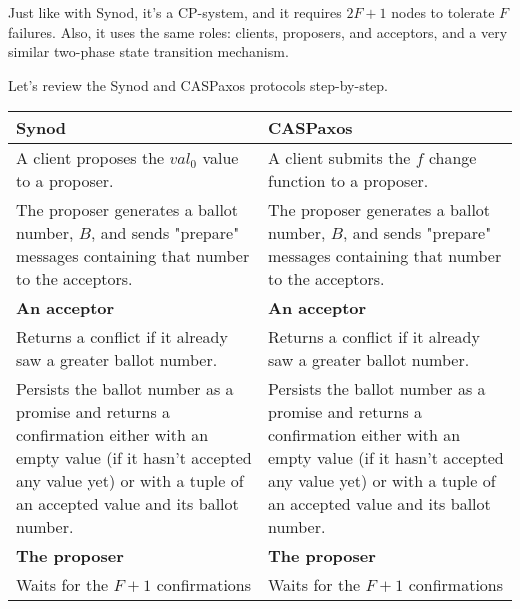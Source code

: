\documentclass[12pt]{article}
\theoremstyle{definition}
\begin{document}
Just like with Synod, it's a CP-system, and it requires $2F+1$ nodes to tolerate $F$ failures. Also, it uses the same roles: clients, proposers, and acceptors, and a very similar two-phase state transition mechanism.

Let's review the Synod and CASPaxos protocols step-by-step.

\begin{center}
\begin{longtable}{p{15em}|p{15em}} 
  \hline
  {\bf Synod}
  &
  {\bf CASPaxos} \\ 
  \hline
  \endfirsthead

  \endhead
  \endfoot
  \endlastfoot
  
  A client proposes the $val_0$ value to a proposer.
  &
  A client submits the $f$ change function to a proposer. \\
  
  \hline
  
  The proposer generates a ballot number, $B$, and sends "prepare" messages containing that number to the acceptors.
  &
  The proposer generates a ballot number, $B$, and sends "prepare" messages containing that number to the acceptors. \\
  
  \hline
  
  {\bf An acceptor}
  &
  {\bf An acceptor} \\[6pt]
  
  
  Returns a conflict if it already saw a greater ballot number.
  &
  Returns a conflict if it already saw a greater ballot number.
  \\[6pt]
  
  
  Persists the ballot number as a promise and returns a confirmation either with an empty value (if it hasn't accepted any value yet) or with a tuple of an accepted value and its ballot number.
  &
  Persists the ballot number as a promise and returns a confirmation either with an empty value (if it hasn't accepted any value yet) or with a tuple of an accepted value and its ballot number.
  \\[6pt]
  
  \hline

  {\bf The proposer}
  &
  {\bf The proposer} \\[6pt]
  

  Waits for the $F+1$ confirmations
  &
  Waits for the $F+1$ confirmations \\[6pt]
  

\end{longtable}
\end{center}
\end{document}
